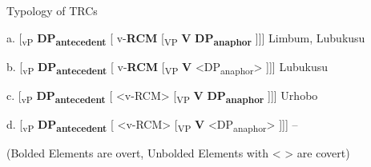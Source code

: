 \documentclass[output=paper]{langsci/langscibook}
\begin{document}
\begin{table}
\caption{Typology of TRCs}


  a.  [\textsubscript{vP} \textbf{DP}\textbf{\textsubscript{antecedent}} [ v-\textbf{RCM}   [\textsubscript{VP} \textbf{V}  \textbf{DP}\textbf{\textsubscript{anaphor}} ]]]     Limbum, Lubukusu



  b.  [\textsubscript{vP} \textbf{DP}\textbf{\textsubscript{antecedent}} [ v-\textbf{RCM}   [\textsubscript{VP} \textbf{V}  <DP\textsubscript{anaphor}> ]]]    Lubukusu  



  c.  [\textsubscript{vP} \textbf{DP}\textbf{\textsubscript{antecedent}} [ <v-RCM>   [\textsubscript{VP} \textbf{V}  \textbf{DP}\textbf{\textsubscript{anaphor}} ]]]    Urhobo



  d.  [\textsubscript{vP} \textbf{DP}\textbf{\textsubscript{antecedent}} [ <v-RCM>   [\textsubscript{VP} \textbf{V}  <DP\textsubscript{anaphor}> ]]]    --



    (Bolded Elements are overt, Unbolded Elements with < > are covert)

\label{tab:1}
\end{table} 
\end{document}
